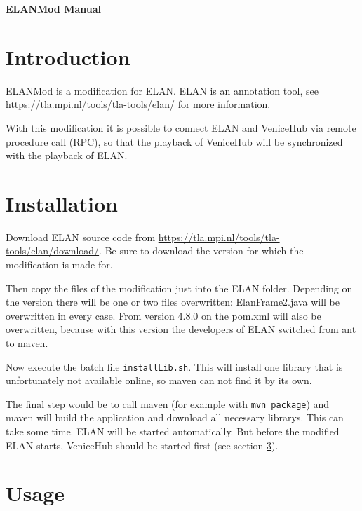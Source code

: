 \documentclass[german,a4paper]{article}
\begin{document}
\begin{center}
{\LARGE\bfseries ELANMod Manual}\\[1.0ex]
\end{center}



\section{Introduction}

ELANMod is a modification for ELAN. ELAN is an annotation tool, see
\url{https://tla.mpi.nl/tools/tla-tools/elan/} for more information.

With this modification it is possible to connect ELAN and VeniceHub via remote procedure call (RPC), so that the playback of VeniceHub will be synchronized with the playback of ELAN.

\section{Installation}

Download ELAN source code from \url{https://tla.mpi.nl/tools/tla-tools/elan/download/}. Be sure to download the version for which the modification is made for.

Then copy the files of the modification just into the ELAN folder. Depending on the version there will be one or two files overwritten: ElanFrame2.java will be overwritten in every case. From version 4.8.0 on the pom.xml will also be overwritten, because with this version the developers of ELAN switched from ant to maven.

Now execute the batch file \texttt{installLib.sh}. This will install one library that is unfortunately not available online, so maven can not find it by its own.

The final step would be to call maven (for example with \texttt{mvn package}) and maven will build the application and download all necessary librarys. This can take some time. ELAN will be started automatically. But before the modified ELAN starts, VeniceHub should be started first (see section \ref{sec:usage}).

\section{Usage}
\label{sec:usage}
\end{document}
